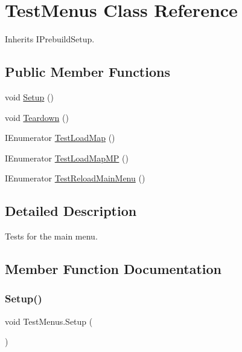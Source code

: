 \hypertarget{class_test_menus}{}\section{Test\+Menus Class Reference}
\label{class_test_menus}


Inherits I\+Prebuild\+Setup.

\subsection*{Public Member Functions}
\begin{DoxyCompactItemize}
\item 
void \hyperlink{class_test_menus_ab244c62e9df58ef0c625afd146cb00df}{Setup} ()
\item 
void \hyperlink{class_test_menus_a619b64f806de65caed364db4c48f80fd}{Teardown} ()
\item 
I\+Enumerator \hyperlink{class_test_menus_a3066743dee815e1898963e78757bcb72}{Test\+Load\+Map} ()
\item 
I\+Enumerator \hyperlink{class_test_menus_a22cbc4a62c604855de0d1bba77bf8d69}{Test\+Load\+Map\+MP} ()
\item 
I\+Enumerator \hyperlink{class_test_menus_a75adcdf234f90804347fcfdc819120c3}{Test\+Reload\+Main\+Menu} ()
\end{DoxyCompactItemize}


\subsection{Detailed Description}
Tests for the main menu. 



\subsection{Member Function Documentation}
\mbox{\label{class_test_menus_ab244c62e9df58ef0c625afd146cb00df}} 
\subsubsection{\texorpdfstring{Setup()}{Setup()}}
{\footnotesize\ttfamily void Test\+Menus.\+Setup (\begin{DoxyParamCaption}{ }\end{DoxyParamCaption})}



